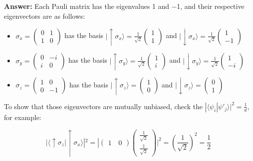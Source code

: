 \documentclass[12pt]{article}
\renewcommand{\>}{\rangle}
\newcommand{\<}{\langle}
\begin{document}
\textbf{Answer: } Each Pauli matrix has the eigenvalues 1 and −1, and their respective eigenvectors are as follows:
\begin{itemize}
    \item $\sigma_x = \left(\begin{array}{cc} 0 & 1 \\ 1 & 0 \end{array} \right)$ has the basis $|{\uparrow} \sigma_x \> = \frac{1}{\sqrt{2}} \left(\begin{array}{cc} 1 \\ 1 \end{array} \right)$ and $|{\downarrow} \sigma_x \> = \frac{1}{\sqrt{2}}\left(\begin{array}{cc} 1 \\ -1 \end{array} \right)$ 
    \item $\sigma_y = 
\left(
\begin{array}{cc}
0 & -i \\
i & 0
\end{array}
\right)$ has the basis $|{\uparrow} \sigma_y \> = \frac{1}{\sqrt{2}} \left(\begin{array}{cc} 1 \\ i \end{array} \right)$ and $|{\downarrow} \sigma_y \> = \frac{1}{\sqrt{2}}\left(\begin{array}{cc} 1 \\ -i \end{array} \right)$
    \item $\sigma_z = 
\left(
\begin{array}{cc}
1 & 0 \\
0 & -1
\end{array}
\right)$ has the basis $|{\uparrow} \sigma_z \> =  \left(\begin{array}{cc} 1 \\ 0 \end{array} \right)$ and $|{\downarrow} \sigma_z \> = \left(\begin{array}{cc} 0 \\ 1 \end{array} \right)$
\end{itemize}

To show that those eigenvectors are mutually unbiased, check the $|\< \psi_i | \psi'_j \>|^2 = \frac{1}{d}$, for example:

$$|\< \uparrow \sigma_z | \uparrow \sigma_x \>|^2 = | \left(\begin{array}{cc} 1 \quad 0 \end{array} \right)  \left(\begin{array}{cc} \frac{1}{\sqrt{2}} \\ \frac{1}{\sqrt{2}} \end{array} \right)|^2 = (\frac{1}{\sqrt{2}})^2 = \frac{1}{2}$$
\end{document}
